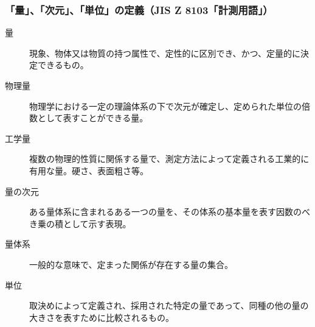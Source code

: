 \documentclass[unicode,12pt,aspectratio=169]{beamer}
\begin{document}
\begin{frame}
\end{frame}

\begin{frame}
	\frametitle{「量」、「次元」、「単位」の定義（JIS Z 8103「計測用語」）}
	\footnotesize
		\begin{description}
			\item[量] 現象、物体又は物質の持つ属性で、定性的に区別でき、かつ、定量的に決定できるもの。
			\item[物理量] 物理学における一定の理論体系の下で次元が確定し、定められた単位の倍数として表すことができる量。
			\item[工学量] 複数の物理的性質に関係する量で、測定方法によって定義される工業的に有用な量。硬さ、表面粗さ等。
			\item[量の次元] ある量体系に含まれるある一つの量を、その体系の基本量を表す因数のべき乗の積として示す表現。
			\item[量体系] 一般的な意味で、定まった関係が存在する量の集合。
			\item[単位] 取決めによって定義され、採用された特定の量であって、同種の他の量の大きさを表すために比較されるもの。
		\end{description}
\end{frame}
\end{document}
